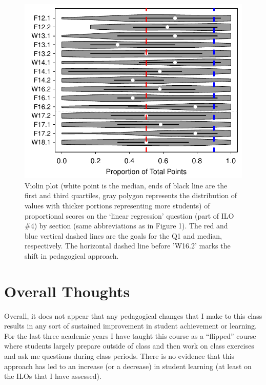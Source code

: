 \documentclass{article}\usepackage[]{graphicx}\usepackage[]{color}
\newenvironment{knitrout}{}{} %
\begin{document}
\begin{knitrout}
\color{fgcolor}\begin{figure}[h]

{\centering \includegraphics[width=.6\linewidth]{Figs/RegBar-1} 

}

\caption[Violin plot (white point is the median, ends of black line are the first and third quartiles, gray polygon represents the distribution of values with thicker portions representing more students) of proportional scores on the `linear regression' question (part of ILO \#4) by section (same abbreviations as in Figure 1)]{Violin plot (white point is the median, ends of black line are the first and third quartiles, gray polygon represents the distribution of values with thicker portions representing more students) of proportional scores on the `linear regression' question (part of ILO \#4) by section (same abbreviations as in Figure 1). The red and blue vertical dashed lines are the goals for the Q1 and median, respectively. The horizontal dashed line before 'W16.2' marks the shift in pedagogical approach.}\label{fig:RegBar}
\end{figure}


\end{knitrout}



\clearpage
\section{Overall Thoughts}
Overall, it does not appear that any pedagogical changes that I make to this class results in any sort of sustained improvement in student achievement or learning. For the last three academic years I have taught this course as a ``flipped'' course where students largely prepare outside of class and then work on class exercises and ask me questions during class periods. There is no evidence that this approach has led to an increase (or a decrease) in student learning (at least on the ILOs that I have assessed).
\end{document}
